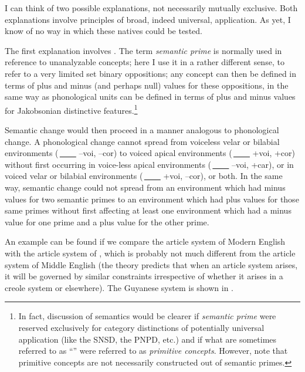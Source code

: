I can think of two possible explanations, not necessarily mutually exclusive. Both explanations involve principles of broad, indeed universal, application. As yet, I know of no way in which these natives could be tested.

The first explanation involves . The term \textit{semantic prime} is normally used in reference to unanalyzable concepts; here I use it in a rather different sense, to refer to a very limited set binary oppositions; any concept can then be defined in terms of plus and minus (and perhaps null) values for these oppositions, in the same way as phonological units can be defined in terms of plus and minus values for Jakobsonian distinctive features.\footnote{In fact, discussion of semantics would be clearer if \textit{semantic prime} were reserved exclusively for category distinctions of potentially universal application (like the SNSD, the PNPD, etc.) and if what are sometimes referred to as ``'' were referred to as \textit{primitive concepts}. However, note that primitive concepts are not necessarily constructed out of semantic primes.}

Semantic change would then proceed in a manner analogous to phonological change. A phonological change cannot spread from voiceless velar or bilabial environments (\,\underline{~~~~} --voi, --cor) to voiced apical environments (\,\underline{~~~~} +voi, +cor) without first occurring in voice-less apical environments (\,\underline{~~~~} --voi, +car), or in voiced velar or bilabial environments (\,\underline{~~~~} +voi, --cor), or both. In the same way, semantic change could not spread from an environment which had minus values for two semantic primes to an environment which had plus values for those same primes without first affecting at least one environment which had a minus value for one prime and a plus value for the other prime.

An example can be found if we compare the article system of Modern English with the article system of , which is probably not much different from the article system of Middle English (the theory predicts that when an article system arises, it will be governed by similar constraints irrespective of whether it arises in a creole system or elsewhere). The Guyanese system is shown in . %


